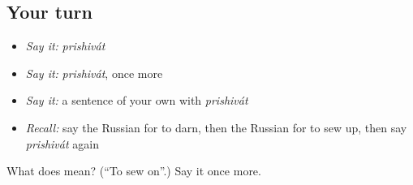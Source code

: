 \subsection*{Your turn}
\begin{itemize}
\raggedright
  \item \emph{Say it:} \emph{prishivát}
  \item \emph{Say it:} \emph{prishivát}, once more
  \item \emph{Say it:} a sentence of your own with \emph{prishivát}
  \item \emph{Recall:} say the Russian for to darn, then the Russian for to sew up, then say \emph{prishivát} again
\end{itemize}

\begin{tcolorbox}[breakable,colback=teal!4,colframe=teal!35!black,title={Before you move on}]
What does  mean? (\textquotedblleft{}To sew on\textquotedblright{}.) Say it once more.
\end{tcolorbox}
